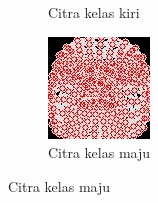 \begin{figure}[H]
\begin{subfigure}{0.3\textwidth}
      \caption{Citra kelas kiri}
      \label{fig:image2}
  \end{subfigure}
  \hfill
  \begin{subfigure}{0.3\textwidth}
      \centering
      \includegraphics[width=\linewidth]{gambar/75 maju.jpg}
      \caption{Citra kelas maju}
      \label{fig:image3}
  \end{subfigure}
  

\end{figure}
